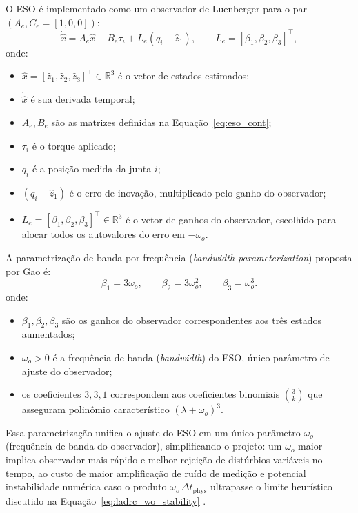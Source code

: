 O ESO é implementado como um observador de Luenberger para o par $(A_e, C_e = [1,0,0])$:
\begin{equation}
    \dot{\hat{x}} = A_e\hat{x} + B_e\tau_i + L_e(q_i - \hat{z}_1), \qquad
    L_e = [\beta_1, \beta_2, \beta_3]^\top,
    \label{eq:eso_observer}
\end{equation}
onde:
\begin{itemize}
    \item $\hat{x} = [\hat{z}_1, \hat{z}_2, \hat{z}_3]^\top \in \mathbb{R}^3$ é o vetor de estados estimados;
    \item $\dot{\hat{x}}$ é sua derivada temporal;
    \item $A_e, B_e$ são as matrizes definidas na Equação~\eqref{eq:eso_cont};
    \item $\tau_i$ é o torque aplicado;
    \item $q_i$ é a posição medida da junta $i$;
    \item $(q_i - \hat{z}_1)$ é o erro de inovação, multiplicado pelo ganho do observador;
    \item $L_e = [\beta_1, \beta_2, \beta_3]^\top \in \mathbb{R}^3$ é o vetor de ganhos do observador, escolhido para alocar todos os autovalores do erro em $-\omega_o$.
\end{itemize}

A parametrização de banda por frequência (\textit{bandwidth parameterization}) proposta por Gao \cite{gao2003scaling} é:
\begin{equation}
    \beta_1 = 3\omega_o, \qquad \beta_2 = 3\omega_o^2, \qquad \beta_3 = \omega_o^3.
    \label{eq:eso_gains}
\end{equation}
onde:
\begin{itemize}
    \item $\beta_1, \beta_2, \beta_3$ são os ganhos do observador correspondentes aos três estados aumentados;
    \item $\omega_o > 0$ é a frequência de banda (\textit{bandwidth}) do ESO, único parâmetro de ajuste do observador;
    \item os coeficientes $3, 3, 1$ correspondem aos coeficientes binomiais $\binom{3}{k}$ que asseguram polinômio característico $(\lambda + \omega_o)^3$.
\end{itemize}

Essa parametrização unifica o ajuste do ESO em um único parâmetro $\omega_o$ (frequência de banda do observador), simplificando o projeto: um $\omega_o$ maior implica observador mais rápido e melhor rejeição de distúrbios variáveis no tempo, ao custo de maior amplificação de ruído de medição e potencial instabilidade numérica caso o produto $\omega_o\,\Delta t_{\text{phys}}$ ultrapasse o limite heurístico discutido na Equação~\eqref{eq:ladrc_wo_stability} \cite{gao2003scaling, zheng2010practical}.

